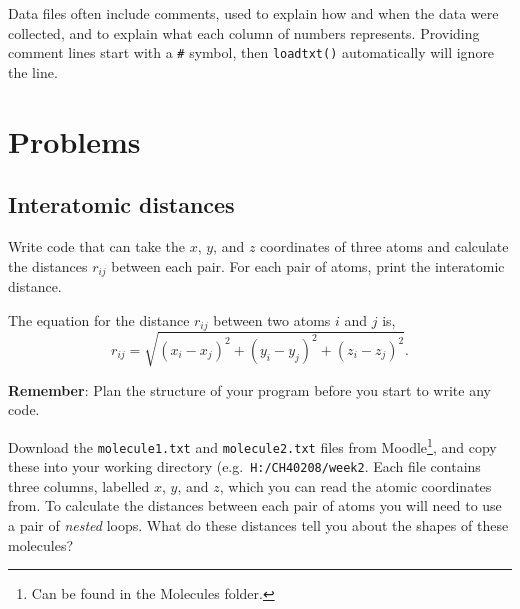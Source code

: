 \documentclass[a4paper]{article}
\begin{document}
Data files often include comments, used to explain how and when the data were collected, and to explain what each column of numbers represents. Providing comment lines start with a \texttt{\#} symbol, then \texttt{loadtxt()} automatically will ignore the line.

\section{Problems}

\subsection{Interatomic distances}

Write code that can take the $x$, $y$, and $z$ coordinates of three atoms and calculate the distances $r_{ij}$ between each pair. For each pair of atoms, print the interatomic distance.

The equation for the distance $r_{ij}$ between two atoms $i$ and $j$ is,
\begin{equation}
	r_{ij} = \sqrt{(x_i - x_j)^2 + (y_i - y_j)^2 + (z_i - z_j)^2}.
\end{equation}

\textbf{Remember}: Plan the structure of your program  before you start to write any code.

Download the \texttt{molecule1.txt} and \texttt{molecule2.txt} files from Moodle\footnote{Can be found in the Molecules folder.}, and copy these into your working directory (e.g.\ \texttt{H:/CH40208/week2}. Each file contains three columns, labelled $x$, $y$, and $z$, which you can read the atomic coordinates from. To calculate the distances between each pair of atoms you will need to use a pair of \emph{nested} loops. What do these distances tell you about the shapes of these molecules?
\end{document}

